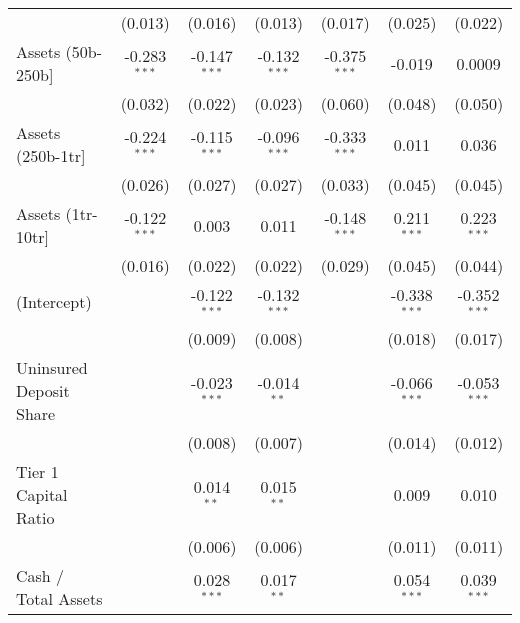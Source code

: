 \begin{table}[htbp]
\begin{adjustbox}{width = 1.2\textwidth, center}
\begin{tabular}{lcccccc}
                                                & (0.013)        & (0.016)        & (0.013)        & (0.017)        & (0.025)        & (0.022)\\   
         Assets (50b-250b]                      & -0.283$^{***}$ & -0.147$^{***}$ & -0.132$^{***}$ & -0.375$^{***}$ & -0.019         & 0.0009\\   
                                                & (0.032)        & (0.022)        & (0.023)        & (0.060)        & (0.048)        & (0.050)\\   
         Assets (250b-1tr]                      & -0.224$^{***}$ & -0.115$^{***}$ & -0.096$^{***}$ & -0.333$^{***}$ & 0.011          & 0.036\\   
                                                & (0.026)        & (0.027)        & (0.027)        & (0.033)        & (0.045)        & (0.045)\\   
         Assets (1tr-10tr]                      & -0.122$^{***}$ & 0.003          & 0.011          & -0.148$^{***}$ & 0.211$^{***}$  & 0.223$^{***}$\\   
                                                & (0.016)        & (0.022)        & (0.022)        & (0.029)        & (0.045)        & (0.044)\\   
         (Intercept)                            &                & -0.122$^{***}$ & -0.132$^{***}$ &                & -0.338$^{***}$ & -0.352$^{***}$\\   
                                                &                & (0.009)        & (0.008)        &                & (0.018)        & (0.017)\\   
         Uninsured Deposit Share                &                & -0.023$^{***}$ & -0.014$^{**}$  &                & -0.066$^{***}$ & -0.053$^{***}$\\   
                                                &                & (0.008)        & (0.007)        &                & (0.014)        & (0.012)\\   
         Tier 1 Capital Ratio                   &                & 0.014$^{**}$   & 0.015$^{**}$   &                & 0.009          & 0.010\\   
                                                &                & (0.006)        & (0.006)        &                & (0.011)        & (0.011)\\   
         Cash / Total Assets                    &                & 0.028$^{***}$  & 0.017$^{**}$   &                & 0.054$^{***}$  & 0.039$^{***}$\\   

\end{tabular}
\end{adjustbox}
\end{table}
